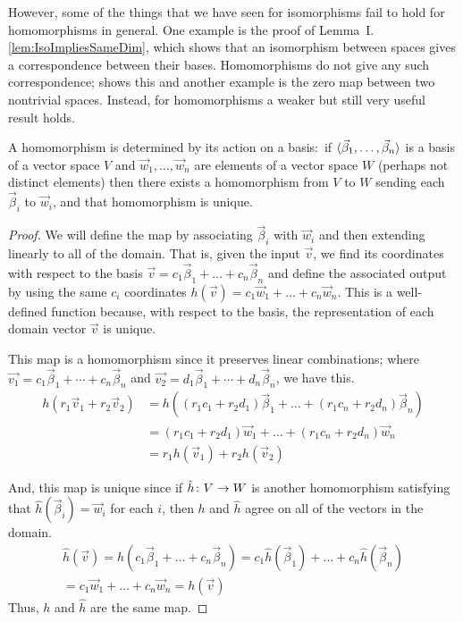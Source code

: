However,
some of the things that we have seen for isomorphisms fail to hold for
homomorphisms in general.
One example is the proof of Lemma~I.\ref{lem:IsoImpliesSameDim}, 
which shows that an isomorphism between spaces gives 
a correspondence between their bases.
Homomorphisms do not give any such correspondence;
 shows this and another example is
the zero map between two nontrivial spaces. 
Instead, for homomorphisms a weaker but still very useful result holds.

\begin{theorem}
\label{th:HomoDetActOnBasis}
A homomorphism is determined by its action on a basis:~if
\( \langle\vec{\beta}_1,\dots,\vec{\beta}_n\rangle \)
is a basis of a vector space \( V \) and
\( \vec{w}_1,\dots,\vec{w}_n \) are elements of
a vector space \( W \)  (perhaps not distinct elements) then
there exists a homomorphism from \( V \) to \( W \) sending each
\( \vec{\beta}_i \) to \( \vec{w}_i \), and that homomorphism is unique.
\end{theorem}

\begin{proof}
We will define the map by 
associating $\vec{\beta}_i$ with $\vec{w}_i$
and then extending linearly to all of the domain.
That is, given the input $\vec{v}$, we find its coordinates with
respect to the basis
\( \vec{v}=c_1\vec{\beta}_1+\dots+c_n\vec{\beta}_n \) and define
the associated output by using the same $c_i$ coordinates
$h(\vec{v})=c_1\vec{w}_1+\dots+c_n\vec{w}_n$.
This is a well-defined function because, with respect to the basis,
the representation of each domain vector \( \vec{v} \) is unique.

This map is a homomorphism since it preserves linear combinations;
where \( \vec{v_1}=c_1\vec{\beta}_1+\cdots+c_n\vec{\beta}_n \) and
\( \vec{v_2}=d_1\vec{\beta}_1+\cdots+d_n\vec{\beta}_n \),
we have this.
\begin{align*}
  h(r_1\vec{v}_1+r_2\vec{v}_2)
  &=h((r_1c_1+r_2d_1)\vec{\beta}_1+\dots+(r_1c_n+r_2d_n)\vec{\beta}_n)  \\
  &=(r_1c_1+r_2d_1)\vec{w}_1+\dots+(r_1c_n+r_2d_n)\vec{w}_n   \\
  &=r_1h(\vec{v}_1)+r_2h(\vec{v}_2)
\end{align*}

And, this map is unique since if \( \mbox{$\hat{h}\colon V\to W$} \) 
is another homomorphism satisfying that \( \hat{h}(\vec{\beta}_i)=\vec{w}_i \) 
for each \( i \),
then \( h \) and \( \hat{h} \) agree on all of the vectors in the domain. 
\begin{multline*}
  \hat{h}(\vec{v})
  =\hat{h}(c_1\vec{\beta}_1+\dots+c_n\vec{\beta}_n)  
  =c_1\hat{h}(\vec{\beta}_1)+\dots+c_n\hat{h}(\vec{\beta}_n)  \\  
  =c_1\vec{w}_1+\dots+c_n\vec{w}_n 
  =h(\vec{v})
\end{multline*}
Thus, $h$ and $\hat{h}$ are the same map.
\end{proof}

